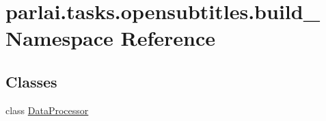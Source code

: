 \hypertarget{namespaceparlai_1_1tasks_1_1opensubtitles_1_1build__2018}{}\section{parlai.\+tasks.\+opensubtitles.\+build\+\_ Namespace Reference}
\label{namespaceparlai_1_1tasks_1_1opensubtitles_1_1build__2018}
\subsection*{Classes}
\begin{DoxyCompactItemize}
\item 
class \hyperlink{classparlai_1_1tasks_1_1opensubtitles_1_1build__2018_1_1DataProcessor}{Data\+Processor}
\end{DoxyCompactItemize}
